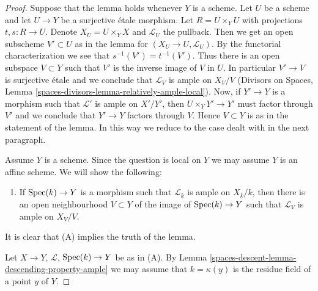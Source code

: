 \begin{proof}
Suppose that the lemma holds whenever $Y$ is a scheme.
Let $U$ be a scheme and let $U \to Y$ be a surjective \'etale morphism.
Let $R = U \times_Y U$ with projections $t, s : R \to U$.
Denote $X_U = U \times_Y X$ and $\mathcal{L}_U$ the pullback.
Then we get an open subscheme $V' \subset U$ as in the lemma
for $(X_U \to U, \mathcal{L}_U)$. By the functorial characterization
we see that $s^{-1}(V') = t^{-1}(V')$.
Thus there is an open subspace $V \subset Y$ such that
$V'$ is the inverse image of $V$ in $U$.
In particular $V' \to V$ is surjective \'etale and we
conclude that $\mathcal{L}_V$ is ample on $X_V/V$
(Divisors on Spaces, Lemma \ref{spaces-divisors-lemma-relatively-ample-local}).
Now, if $Y' \to Y$ is a morphism such that
$\mathcal{L}'$ is ample on $X'/Y'$, then
$U \times_Y Y' \to Y'$ must factor through $V'$
and we conclude that $Y' \to Y$ factors through $V$.
Hence $V \subset Y$ is as in the statement of the lemma.
In this way we reduce to the case dealt with in the next
paragraph.

\medskip\noindent
Assume $Y$ is a scheme. Since the question is local on $Y$
we may assume $Y$ is an affine scheme. We will show the
following:
\begin{enumerate}
\item[(A)] If $\operatorname{Spec}(k) \to Y$ is a morphism such that
$\mathcal{L}_k$ is ample on $X_k/k$, then there is an
open neighbourhood $V \subset Y$ of the image of $\operatorname{Spec}(k) \to Y$
such that $\mathcal{L}_V$ is ample on $X_V/V$.
\end{enumerate}
It is clear that (A) implies the truth of the lemma.

\medskip\noindent
Let $X \to Y$, $\mathcal{L}$, $\operatorname{Spec}(k) \to Y$ be as in (A).
By Lemma \ref{spaces-descent-lemma-descending-property-ample}
we may assume that $k = \kappa(y)$ is the residue field of a point $y$
of $Y$.


\end{proof}

